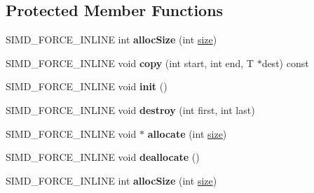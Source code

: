 \subsection*{Protected Member Functions}
\begin{DoxyCompactItemize}
\item 
\mbox{\label{classbtAlignedObjectArray_aedd4d8b9a38019cb1f98f794a6bb503d}} 
S\+I\+M\+D\+\_\+\+F\+O\+R\+C\+E\+\_\+\+I\+N\+L\+I\+NE int {\bfseries alloc\+Size} (int \hyperlink{classbtAlignedObjectArray_a31de8d83d29c6edd1493fc583091194c}{size})
\item 
\mbox{\label{classbtAlignedObjectArray_aebd4754717ca52e5def692d42e5274c5}} 
S\+I\+M\+D\+\_\+\+F\+O\+R\+C\+E\+\_\+\+I\+N\+L\+I\+NE void {\bfseries copy} (int start, int end, T $\ast$dest) const
\item 
\mbox{\label{classbtAlignedObjectArray_a336631607f9f5f08001866ed11b5fd64}} 
S\+I\+M\+D\+\_\+\+F\+O\+R\+C\+E\+\_\+\+I\+N\+L\+I\+NE void {\bfseries init} ()
\item 
\mbox{\label{classbtAlignedObjectArray_a6dc404237b049258d12fb2ca62b934f7}} 
S\+I\+M\+D\+\_\+\+F\+O\+R\+C\+E\+\_\+\+I\+N\+L\+I\+NE void {\bfseries destroy} (int first, int last)
\item 
\mbox{\label{classbtAlignedObjectArray_a8943d09db3d72365b8c3ac6046225858}} 
S\+I\+M\+D\+\_\+\+F\+O\+R\+C\+E\+\_\+\+I\+N\+L\+I\+NE void $\ast$ {\bfseries allocate} (int \hyperlink{classbtAlignedObjectArray_a31de8d83d29c6edd1493fc583091194c}{size})
\item 
\mbox{\label{classbtAlignedObjectArray_acebca91940aecdb1c11718bc08b511c9}} 
S\+I\+M\+D\+\_\+\+F\+O\+R\+C\+E\+\_\+\+I\+N\+L\+I\+NE void {\bfseries deallocate} ()
\item 
\mbox{\label{classbtAlignedObjectArray_aedd4d8b9a38019cb1f98f794a6bb503d}} 
S\+I\+M\+D\+\_\+\+F\+O\+R\+C\+E\+\_\+\+I\+N\+L\+I\+NE int {\bfseries alloc\+Size} (int \hyperlink{classbtAlignedObjectArray_a31de8d83d29c6edd1493fc583091194c}{size})
\item 
\mbox{\label{classbtAlignedObjectArray_aebd4754717ca52e5def692d42e5274c5}} 

\end{DoxyCompactItemize}
